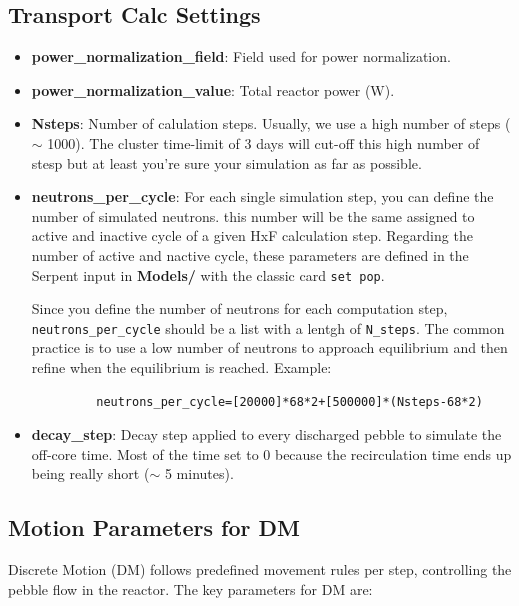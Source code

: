 \documentclass{article}
\begin{document}
\subsection{Transport Calc Settings}
\begin{itemize}
    \item \textbf{power\_normalization\_field}: Field used for power normalization.
    \item \textbf{power\_normalization\_value}: Total reactor power (W).
    \item \textbf{Nsteps}: Number of calulation steps. Usually, we use a high number of steps ($\sim$ 1000). The cluster time-limit of 3 days will cut-off this high number of stesp but at least you're sure your simulation as far as possible.
    \item \textbf{neutrons\_per\_cycle}: For each single simulation step, you can define the number of simulated neutrons. this number will be the same assigned to active and inactive cycle of a given HxF calculation step. Regarding the number of active and nactive cycle, these parameters are defined in the Serpent input in \textbf{Models/} with the classic card \texttt{set pop}. 
    
    Since you define the number of neutrons for each computation step, \texttt{neutrons\_per\_cycle} should be a list with a lentgh of \texttt{N\_steps}. The common practice is to use a low number of neutrons to approach equilibrium and then refine when the equilibrium is reached. Example:
    \begin{verbatim}
         neutrons_per_cycle=[20000]*68*2+[500000]*(Nsteps-68*2)
    \end{verbatim}
    \item \textbf{decay\_step}: Decay step applied to every discharged pebble to simulate the off-core time. Most of the time set to 0 because the recirculation time ends up being really short ($\sim$ 5 minutes). 
\end{itemize}

\subsection{Motion Parameters for DM}
Discrete Motion (DM) follows predefined movement rules per step, controlling the pebble flow in the reactor. The key parameters for DM are:
\end{document}

